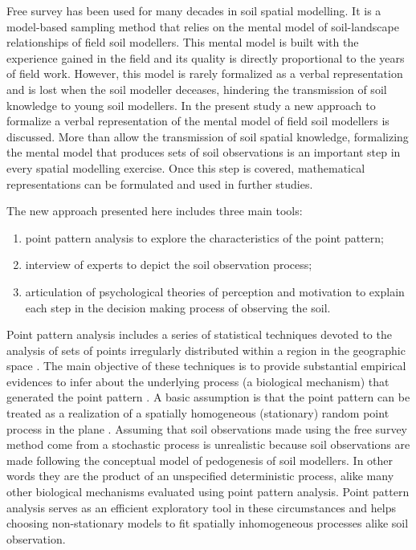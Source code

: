 
Free survey has been used for many decades in soil spatial modelling. It is a model-based sampling method that 
relies on the mental model of soil-landscape relationships of field soil modellers. This mental model is built 
with the experience gained in the field and its quality is directly proportional to the years of field work. 
However, this model is rarely formalized as a verbal representation and is lost when the soil modeller 
deceases, hindering the transmission of soil knowledge to young soil modellers. In the present study a new 
approach to formalize a verbal representation of the mental model of field soil modellers is discussed. More 
than allow the transmission of soil spatial knowledge, formalizing the mental model that produces sets of soil 
observations is an important step in every spatial modelling exercise. Once this step is covered, mathematical 
representations can be formulated and used in further studies.

The new approach presented here includes three main tools:

\begin{enumerate}
 \item point pattern analysis to explore the characteristics of the point pattern;
 
 \item interview of experts to depict the soil observation process;
 
 \item articulation of psychological theories of perception and motivation to explain each step in the decision
 making process of observing the soil.
\end{enumerate}

Point pattern analysis includes a series of statistical techniques devoted to the analysis of sets of points 
irregularly distributed within a region in the geographic space \cite{Diggle2003}. The main objective of these 
techniques is to provide substantial empirical evidences to infer about the underlying process (a biological 
mechanism) that generated the point pattern \cite{BivandEtAl2008}. A basic assumption is that the point pattern
can be treated as a realization of a spatially homogeneous (stationary) random point process in the plane 
\cite{Diggle2003}. Assuming that soil observations made using the free survey method come from a stochastic 
process is unrealistic because soil observations are made following the conceptual model of pedogenesis of soil
modellers. In other words they are the product of an unspecified deterministic process, alike many other 
biological mechanisms evaluated using point pattern analysis. Point pattern analysis serves as an efficient 
exploratory tool in these circumstances and helps choosing non-stationary models to fit spatially inhomogeneous
processes \cite{Baddeley2010} alike soil observation.

